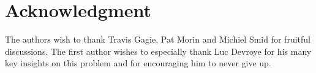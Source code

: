 \documentclass{llncs}\usepackage[english]{babel}
\begin{document}
\section*{Acknowledgment}
The authors wish to thank Travis Gagie, Pat Morin and Michiel Smid for fruitful discussions. The
first author wishes to especially thank Luc Devroye for his many key insights on this problem
and for encouraging him to never give up.

    

\end{document}
